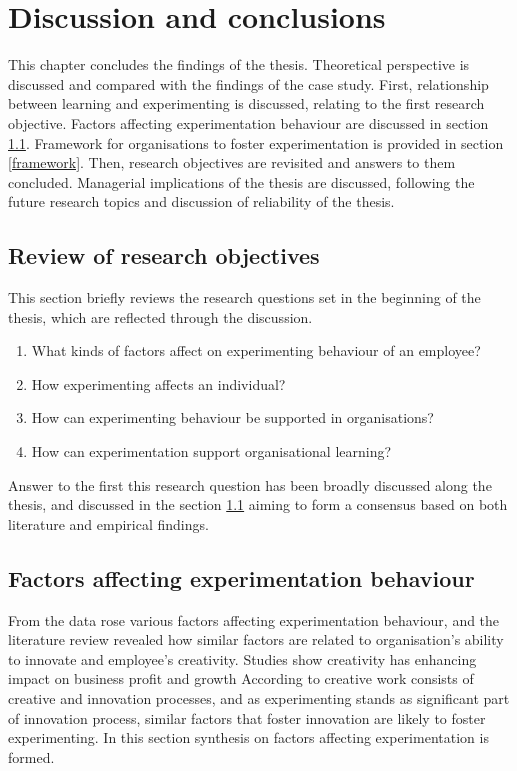 \chapter{Discussion and conclusions}
This chapter concludes the findings of the thesis. Theoretical perspective is discussed and compared with the findings of the case study. First, relationship between learning and experimenting is discussed, relating to the first research objective. Factors affecting experimentation behaviour are discussed in section \ref{fae}. Framework for organisations to foster experimentation is provided in section \ref{framework}. Then, research objectives are revisited and answers to them concluded. Managerial implications of the thesis are discussed, following the future research topics and discussion of reliability of the thesis. 

\section*{Review of research objectives}
This section briefly reviews the research questions set in the beginning of the thesis, which are reflected through the discussion. 

\begin{enumerate}
 \item What kinds of factors affect on experimenting behaviour of an employee? 
 \item How experimenting affects an individual? 
  \item How can experimenting behaviour be supported in organisations?
  \item How can experimentation support organisational learning?
\end{enumerate}

Answer to the first this research question has been broadly discussed along the thesis, and discussed in the section \ref{fae} aiming to form a consensus based on both literature and empirical findings. 

\section{Factors affecting experimentation behaviour} \label{fae}
From the data rose various factors affecting experimentation behaviour, and the literature review revealed how similar factors are related to organisation's ability to innovate and employee's creativity. Studies show creativity has enhancing impact on business profit and growth \citep{nystrom1990organizational} According to \citet{vincent2002divergent} creative work consists of creative and innovation processes, and as experimenting stands as significant part of innovation process, similar factors that foster innovation are likely to foster experimenting. In this section synthesis on factors affecting experimentation is formed.

